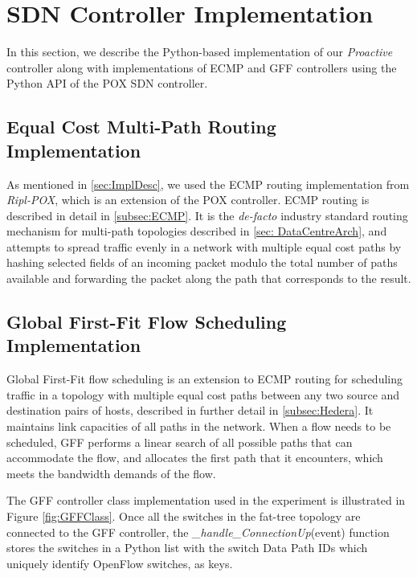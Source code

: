 \section{SDN Controller Implementation} \label{sec:ControlImpl}

In this section, we describe the Python-based implementation of our \textit{Proactive} controller along with implementations of ECMP and GFF controllers using the Python API of the POX SDN controller.

\subsection{Equal Cost Multi-Path Routing Implementation} \label{subsec:ECMPImpl}

As mentioned in \ref{sec:ImplDesc}, we used the ECMP routing implementation from \textit{Ripl-POX}, which is an extension of the POX controller.  ECMP routing is described in detail in \ref{subsec:ECMP}. It is the \textit{de-facto} industry standard routing mechanism for multi-path topologies \cite{al2010hedera} described in \ref{sec: DataCentreArch}, and attempts to spread traffic evenly in a network with multiple equal cost paths by hashing selected fields of an incoming packet modulo the total number of paths available and forwarding the packet along the path that corresponds to the result. 

\subsection{Global First-Fit Flow Scheduling Implementation} \label{subsec:GFFImpl}

Global First-Fit flow scheduling is an extension to ECMP routing for scheduling traffic in a topology with multiple equal cost paths between any two source and destination pairs of hosts, described in further detail in \ref{subsec:Hedera}. It maintains link capacities of all paths in the network. When a flow needs to be scheduled, GFF performs a linear search of all possible paths that can accommodate the flow, and allocates the first path that it encounters, which meets the bandwidth demands of the flow.   

The GFF controller class implementation \cite{gffImplementation} used in the experiment is illustrated in Figure \ref{fig:GFFClass}. Once all the switches in the fat-tree topology are connected to the GFF controller, the \textit{\_handle\_ConnectionUp}(event) function stores the switches in a Python list with the switch Data Path IDs which uniquely identify OpenFlow switches, as keys.  

